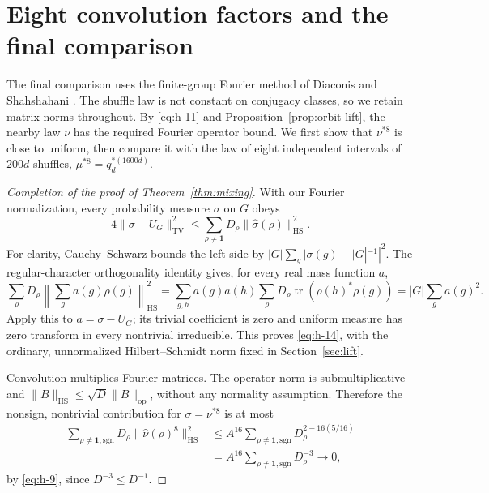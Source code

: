 \documentclass[11pt]{article}
\theoremstyle{remark}
\numberwithin{equation}{section}
\begin{document}
\section{Eight convolution factors and the final comparison}\label{sec:completion}

The final comparison uses the finite-group Fourier method of
Diaconis and Shahshahani \cite[Section~3]{DiaconisShahshahani1981}.
The shuffle law is not constant on conjugacy classes, so we retain matrix norms throughout.
By \eqref{eq:h-11} and Proposition~\ref{prop:orbit-lift}, the nearby law
\(\nu\) has the required Fourier operator bound. We first show that
\(\nu^{*8}\) is close to uniform, then compare it with the law of eight
independent intervals of \(200d\) shuffles,
\(\mu^{*8}=q_d^{*(1600d)}\).

\begin{proof}[Completion of the proof of Theorem~\ref{thm:mixing}]
With our Fourier normalization, every probability measure \(\sigma\) on \(G\) obeys
\begin{equation}\label{eq:h-14}
 4\|\sigma-U_G\|_{\mathrm{TV}}^2
 \le\sum_{\rho\ne\mathbf1}D_\rho
                         \|\widehat\sigma(\rho)\|_{\mathrm{HS}}^2.
\end{equation}
For clarity, Cauchy--Schwarz bounds the left side by
\(|G|\sum_g|\sigma(g)-|G|^{-1}|^2\).
The regular-character orthogonality identity gives, for every real mass function \(a\),
\[
 \sum_\rho D_\rho\left\|\sum_g a(g)\rho(g)\right\|_{\mathrm{HS}}^2
 =\sum_{g,h}a(g)a(h)\sum_\rho D_\rho
                 \operatorname{tr}(\rho(h)^*\rho(g))
 =|G|\sum_g a(g)^2.
\]
Apply this to \(a=\sigma-U_G\); its trivial coefficient is zero and uniform measure has zero transform in every nontrivial irreducible. This proves \eqref{eq:h-14}, with the ordinary, unnormalized Hilbert--Schmidt norm fixed in Section~\ref{sec:lift}.

Convolution multiplies Fourier matrices. The operator norm is submultiplicative and \(\|B\|_{\mathrm{HS}}\le\sqrt D\|B\|_{\mathrm{op}}\), without any normality assumption. Therefore the nonsign, nontrivial contribution for \(\sigma=\nu^{*8}\) is at most
\[
 \begin{aligned}
 \sum_{\rho\ne\mathbf1,\mathrm{sgn}}D_\rho
         \|\widehat\nu(\rho)^8\|_{\mathrm{HS}}^2
 &\le A^{16}\sum_{\rho\ne\mathbf1,\mathrm{sgn}}
                    D_\rho^{2-16(5/16)}\\
 &=A^{16}\sum_{\rho\ne\mathbf1,\mathrm{sgn}}D_\rho^{-3}
 \longrightarrow0,
 \end{aligned}
\]
by \eqref{eq:h-9}, since \(D^{-3}\le D^{-1}\).


\end{proof}
\end{document}
